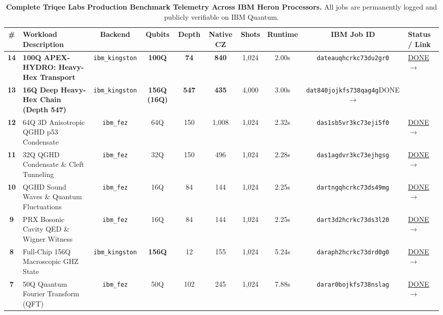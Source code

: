 \documentclass[twocolumn,secnumarabic,amssymb, nobibnotes, aps, prx, superscriptaddress]{revtex4-2}
\begin{document}
\begin{table}[t]
\centering
\caption{\textbf{Complete Triqee Labs Production Benchmark Telemetry Across IBM Heron Processors.} All jobs are permanently logged and publicly verifiable on IBM Quantum.}
\label{tab:benchmarks}
\begin{ruledtabular}
\begin{tabular}{clcccccccl}
\# & Workload Description & Backend & Qubits & Depth & Native CZ & Shots & Runtime & IBM Job ID & Status / Link \\
\hline
\textbf{14} & \textbf{100Q APEX-HYDRO: Heavy-Hex Transport} & \texttt{ibm\_kingston} & \textbf{100Q} & \textbf{74} & \textbf{840} & 1,024 & 2.00s & \texttt{dateauqhcrkc73du2gr0} & \href{https://quantum.ibm.com/jobs/dateauqhcrkc73du2gr0}{DONE $\rightarrow$} \\
\textbf{13} & \textbf{16Q Deep Heavy-Hex Chain (Depth 547)} & \texttt{ibm\_kingston} & \textbf{156Q (16Q)} & \textbf{547} & \textbf{435} & 4,000 & 3.00s & \texttt{dat840jojkfs738qag4g}{DONE $\rightarrow$} \\
\textbf{12} & 64Q 3D Anisotropic QGHD p53 Condensate & \texttt{ibm\_fez} & 64Q & 150 & 1,008 & 1,024 & 2.32s & \texttt{das1sb5vr3kc73eji5f0} & \href{https://quantum.ibm.com/jobs/das1sb5vr3kc73eji5f0}{DONE $\rightarrow$} \\
\textbf{11} & 32Q QGHD Condensate \& Cleft Tunneling & \texttt{ibm\_fez} & 32Q & 150 & 496 & 1,024 & 2.28s & \texttt{das1agdvr3kc73ejhgsg} & \href{https://quantum.ibm.com/jobs/das1agdvr3kc73ejhgsg}{DONE $\rightarrow$} \\
\textbf{10} & QGHD Sound Waves \& Quantum Fluctuations & \texttt{ibm\_fez} & 16Q & 84 & 144 & 1,024 & 2.25s & \texttt{dartngqhcrkc73ds49mg} & \href{https://quantum.ibm.com/jobs/dartngqhcrkc73ds49mg}{DONE $\rightarrow$} \\
\textbf{9} & PRX Bosonic Cavity QED \& Wigner Witness & \texttt{ibm\_fez} & 16Q & 84 & 144 & 1,024 & 2.25s & \texttt{dart3d2hcrkc73ds3l20} & \href{https://quantum.ibm.com/jobs/dart3d2hcrkc73ds3l20}{DONE $\rightarrow$} \\
\textbf{8} & Full-Chip 156Q Macroscopic GHZ State & \texttt{ibm\_kingston} & \textbf{156Q} & 12 & 155 & 1,024 & 5.24s & \texttt{daraph2hcrkc73drd0g0} & \href{https://quantum.ibm.com/jobs/daraph2hcrkc73drd0g0}{DONE $\rightarrow$} \\
\textbf{7} & 50Q Quantum Fourier Transform (QFT) & \texttt{ibm\_fez} & 50Q & 102 & 245 & 1,024 & 7.88s & \texttt{darar0bojkfs738nslag} & \href{https://quantum.ibm.com/jobs/darar0bojkfs738nslag}{DONE $\rightarrow$} \\

\end{tabular}
\end{ruledtabular}
\end{table}
\end{document}
